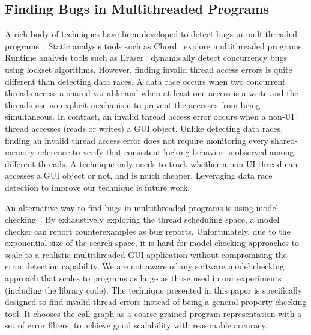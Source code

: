 \tinystep
\subsection{Finding Bugs in Multithreaded Programs}


A rich body of techniques have been developed to detect bugs in multithreaded programs~\cite{Huang:2011:PPC:2001420.2001438, Naik:2006, Savage:1997, smc}.
Static analysis tools such as Chord~\cite{Naik:2006}
explore multithreaded programs. Runtime
analysis tools such as Eraser~\cite{Savage:1997}  dynamically detect concurrency bugs using lockset
algorithms.
However, finding invalid thread access errors is quite different than detecting data races.
A data race occurs when two concurrent threads access
a shared variable and when at least one access is a write and the threads
use no explicit mechanism to prevent the accesses from being simultaneous. In contrast,
an invalid thread access error occurs when a non-UI thread accesses (reads or writes) a GUI object.
Unlike detecting data races, finding an invalid thread access error does not require monitoring every shared-memory
reference to verify that consistent locking behavior is observed among different threads.
A technique only needs to track whether a non-UI thread can accesses a GUI object or not,
and is much cheaper. Leveraging data race detection to 
improve our technique is future work.


An alternative way to find bugs in multithreaded programs is using model checking~\cite{smc}.
By exhaustively exploring the thread scheduling space, a model checker can
report counterexamples as bug reports.
Unfortunately, due to the exponential size of the search space,
it is hard for model checking approaches to scale to a realistic multithreaded GUI application
 without compromising the error detection capability. 
We are not aware of any software model checking approach that scales to programs
as large as those used in our experiments (including the library code).
The technique presented in this paper is specifically designed to find invalid thread
errors instead of being a general property checking tool. 
It chooses the call graph as a coarse-grained program representation with a
set of error filters, to achieve good scalability with reasonable accuracy.


